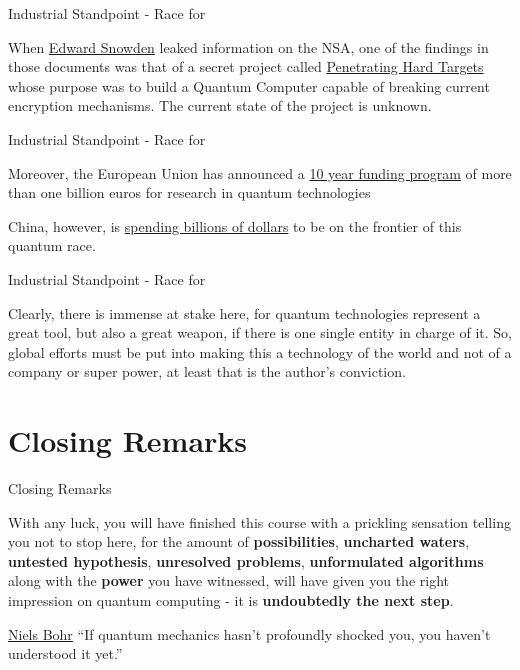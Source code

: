\documentclass[aspectratio=43]{beamer}
\begin{document}
\begin{frame}{Industrial Standpoint - Race for \q}
    \begin{card}
        When \href{https://en.wikipedia.org/wiki/Edward_Snowden}{Edward Snowden} leaked information on the NSA, one of the findings in those documents was that of a secret project called \href{https://www.washingtonpost.com/world/national-security/nsa-seeks-to-build-quantum-computer-that-could-crack-most-types-of-encryption/2014/01/02/8fff297e-7195-11e3-8def-a33011492df2_story.html?utm_term=.0d294e5de470}{Penetrating Hard Targets} whose purpose was to build a Quantum Computer capable of breaking current encryption mechanisms. The current state of the project is unknown.
    \end{card}
\pagenumber
\end{frame}


\begin{frame}{Industrial Standpoint - Race for \q}
    \begin{card}
        Moreover, the European Union has announced a \href{https://qt.eu/}{10 year funding program} of more than one billion euros for research in quantum technologies
    \end{card}
    \begin{card}
        China, however, is \href{https://www.foreignaffairs.com/articles/china/2018-09-26/chinas-quantum-future}{spending billions of dollars} to be on the frontier of this quantum race.
    \end{card}
\pagenumber
\end{frame}

\begin{frame}{Industrial Standpoint - Race for \q}
    \begin{card}
        Clearly, there is immense at stake here, for quantum technologies represent a great tool, but also a great weapon, if there is one single entity in charge of it. So, global efforts must be put into making this a technology of the world and not of a company or super power, at least that is the author's conviction.
    \end{card}
\pagenumber
\end{frame}

\section{Closing Remarks}
\begin{frame}{Closing Remarks}
    \begin{card}
        With any luck, you will have finished this course with a prickling sensation telling you not to stop here, for the amount of \textbf{possibilities}, \textbf{uncharted waters}, \textbf{untested hypothesis}, \textbf{unresolved problems}, \textbf{unformulated algorithms} along with the \textbf{power} you have witnessed, will have given you the right impression on quantum computing - it is \textbf{undoubtedly the next step}.
    \end{card}
\end{frame}

\begin{frame}
    \LARGE{\begin{chapquote}[2pt]{\href{https://en.wikipedia.org/wiki/Niels_Bohr}{Niels Bohr}}
        ``If quantum mechanics hasn't profoundly shocked you, you haven't understood it yet.''
    \end{chapquote}}
\end{frame}
\end{document}
